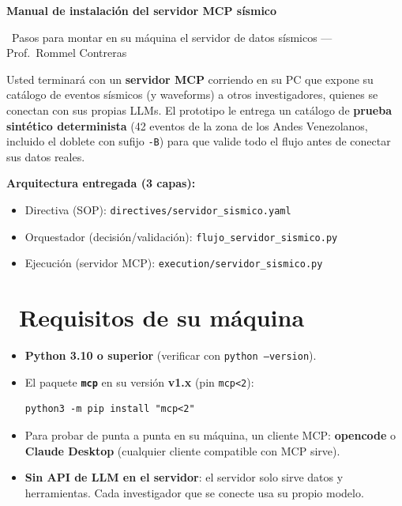 \documentclass[11pt,a4paper]{article}
\newcommand{\iconoBanda}{microchip}
\newcommand{\bandaTitulo}[3][fondoOscuro]{%
  \begin{tcolorbox}[
    enhanced,
    colback=#1, colframe=#1,
    boxrule=0pt, arc=8pt, outer arc=8pt,
    width=\linewidth,
    top=18pt, bottom=6pt, left=14pt, right=14pt,
    borderline south={3.5pt}{0pt}{cyanNeon},
  ]
    \begin{minipage}[c]{0.07\linewidth}
      \centering
      \textcolor{cyanNeon}{\fontsize{30}{30}\selectfont\faIcon{\iconoBanda}}
    \end{minipage}%
    \hspace{8pt}%
    \begin{minipage}[c]{0.88\linewidth}
      {\fontsize{20}{24}\selectfont\bfseries\color{white}#2}\par\vspace{5pt}%
      \textcolor{cyanNeon!80!white}{\small\faIcon{angle-right}~#3}%
    \end{minipage}
    \vspace{4pt}
  \end{tcolorbox}%
  \vspace{8pt}%
}
\newcommand{\iconotexto}[2]{\textcolor{cyanNeon}{\faIcon{#1}}~#2}
\begin{document}
\renewcommand{\iconoBanda}{book-open}
\bandaTitulo[verdeTurquesa]{Manual de instalaci\'on del servidor MCP s\'ismico}{Pasos para montar en su m\'aquina el servidor de datos s\'ismicos --- Prof.\ Rommel Contreras}

\vspace{6pt}
\begin{tcolorbox}[tarjetaIcono, title={\faIcon{list-check}~Qu\'e lograr\'a con esta gu\'ia}]
Usted terminar\'a con un \textbf{servidor MCP} corriendo en su PC que expone su cat\'alogo de eventos
s\'ismicos (y waveforms) a otros investigadores, quienes se conectan con sus propias LLMs. El
prototipo le entrega un cat\'alogo de \textbf{prueba sint\'etico determinista} (42 eventos de la zona
de los Andes Venezolanos, incluido el doblete con sufijo {\texttt{-B}}) para que valide todo el flujo
antes de conectar sus datos reales.

\medskip
\textbf{Arquitectura entregada (3 capas):}
\begin{itemize}[leftmargin=1.6em, itemsep=2pt]
  \item Directiva (SOP): \texttt{directives/servidor\_sismico.yaml}
  \item Orquestador (decisi\'on/validaci\'on): \texttt{flujo\_servidor\_sismico.py}
  \item Ejecuci\'on (servidor MCP): \texttt{execution/servidor\_sismico.py}
\end{itemize}
\end{tcolorbox}

\section{\iconotexto{computer}{Requisitos de su m\'aquina}}

\begin{tcolorbox}[tarjetaDato, title={\faIcon{terminal}~Software necesario}]
\begin{itemize}[leftmargin=1.6em, itemsep=2pt]
  \item \textbf{Python 3.10 o superior} (verificar con \texttt{python --version}).
  \item El paquete \textbf{\texttt{mcp}} en su versi\'on \textbf{v1.x} (pin \texttt{mcp<2}):
\begin{lstlisting}
python3 -m pip install "mcp<2"
\end{lstlisting}
  \item Para probar de punta a punta en su m\'aquina, un cliente MCP: \textbf{opencode}
        o \textbf{Claude Desktop} (cualquier cliente compatible con MCP sirve).
  \item \textbf{Sin API de LLM en el servidor}: el servidor solo sirve datos y herramientas.
        Cada investigador que se conecte usa su propio modelo.
\end{itemize}
\end{tcolorbox}
\end{document}
